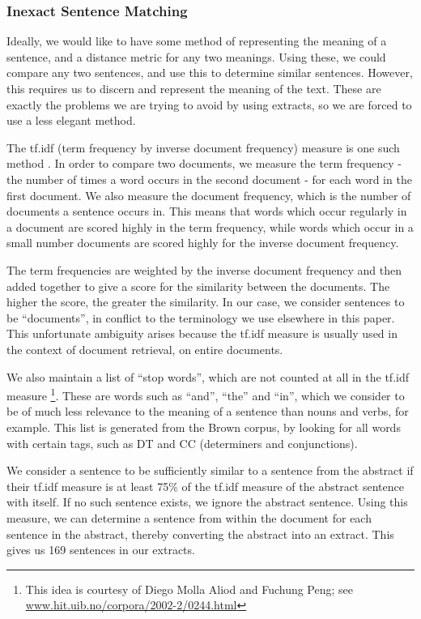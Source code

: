 \documentclass[a4paper, 10pt]{article}
\begin{document}
\subsubsection{Inexact Sentence Matching}
Ideally, we would like to have some method of representing the meaning of a sentence, and a distance metric for any two meanings. Using these, we could compare any two sentences, and use this to determine similar sentences. However, this requires us to discern and represent the meaning of the text. These are exactly the problems we are trying to avoid by using extracts, so we are forced to use a less elegant method. 

The tf.idf (term frequency by inverse document frequency) measure is one such method \cite[pp. 651-654]{JM}. In order to compare two documents, we measure the term frequency - the number of times a word occurs in the second document - for each word in the first document. We also measure the document frequency, which is the number of documents a sentence occurs in. This means that words which occur regularly in a document are scored highly in the term frequency, while words which occur in a small number documents are scored highly for the inverse document frequency.

The term frequencies are weighted by the inverse document frequency and then added together to give a score for the similarity between the documents. The higher the score, the greater the similarity. In our case, we consider sentences to be ``documents'', in conflict to the terminology we use elsewhere in this paper. This unfortunate ambiguity arises because the tf.idf measure is usually used in the context of document retrieval, on entire documents.

We also maintain a list of ``stop words'', which are not counted at all in the tf.idf measure \footnote{This idea is courtesy of Diego Molla Aliod and Fuchung Peng; see \url{www.hit.uib.no/corpora/2002-2/0244.html}}. These are words such as ``and'', ``the'' and ``in'', which we consider to be of much less relevance to the meaning of a sentence than nouns and verbs, for example. This list is generated from the Brown corpus, by looking for all words with certain tags, such as DT and CC (determiners and conjunctions).

We consider a sentence to be sufficiently similar to a sentence from the abstract if their tf.idf measure is at least 75\% of the tf.idf measure of the abstract sentence with itself. If no such sentence exists, we ignore the abstract sentence. Using this measure, we can determine a sentence from within the document for each sentence in the abstract, thereby converting the abstract into an extract. This gives us 169 sentences in our extracts.
\end{document}
